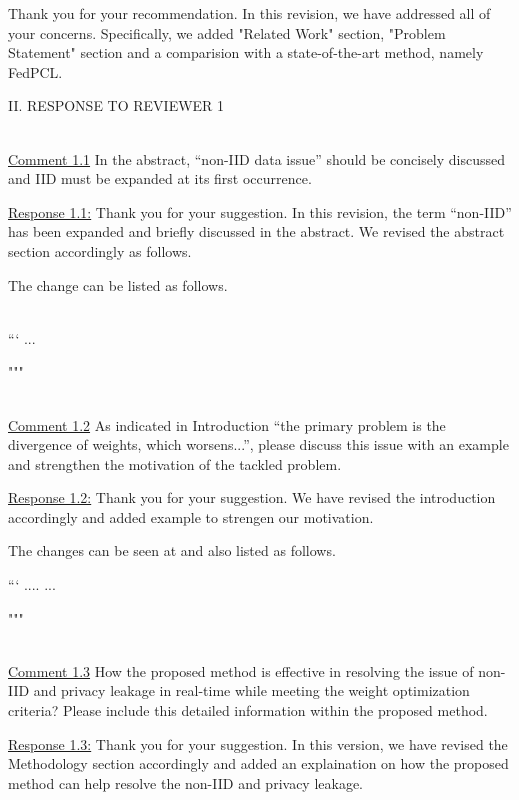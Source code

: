 \color{black}
Thank you for your recommendation. In this revision, we have addressed all of your concerns. Specifically, we added "Related Work" section, "Problem Statement" section and a comparision with a state-of-the-art method, namely FedPCL.




\newpage

II. RESPONSE TO REVIEWER 1

~\\
\color{blue}
\underline{Comment 1.1}
In the abstract, “non-IID data issue” should be concisely discussed and IID
must be expanded at its first occurrence.

\color{black}
\underline{Response 1.1:}
Thank you for your suggestion. In this revision, the term ``non-IID'' has been expanded and briefly discussed in the abstract. We revised the abstract section accordingly as follows.

\colorbox{marygold}{The change can be listed as follows.}\\~


```
...

"""



~\\
\color{blue}
\underline{Comment 1.2}
As indicated in Introduction “the primary problem is the divergence of
weights, which worsens...”, please discuss this issue with an example and
strengthen the motivation of the tackled problem.

\color{black}
\underline{Response 1.2:}
Thank you for your suggestion. We have revised the introduction accordingly and added example to strengen our motivation. 

\colorbox{marygold}{The changes can be seen at  and also listed as follows.}

```
....
...

"""

~\\
\color{blue}
\underline{Comment 1.3}
How the proposed method is effective in resolving the issue of non-IID and
privacy leakage in real-time while meeting the weight optimization criteria?
Please include this detailed information within the proposed method.

\color{black}
\underline{Response 1.3:}
Thank you for your suggestion. In this version, we have revised the Methodology section accordingly and added an explaination on how the proposed method can help resolve the non-IID and privacy leakage. 

